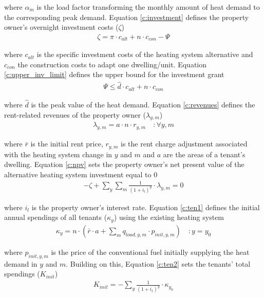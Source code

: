 where $\alpha_{m}$ is the load factor transforming the monthly amount of heat demand to the corresponding peak demand. Equation \ref{c:investment} defines the property owner's overnight investment costs ($\zeta$)
\begin{align}\label{c:investment}
\zeta = \pi \cdot c_{alt} + n \cdot c_{con} - \Psi
\end{align}

where $c_{alt}$ is the specific investment costs of the heating system alternative and $c_{con}$ the construction costs to adapt one dwelling/unit. Equation \ref{c:upper_inv_limit} defines the upper bound for the investment grant 
\begin{align}\label{c:upper_inv_limit}
\Psi \leq \hat{d} \cdot c_{alt} + n \cdot c_{con}
\end{align}

where $\hat{d}$ is the peak value of the heat demand. Equation \ref{c:revenues} defines the rent-related revenues of the property owner ($\lambda_{y,m}$)
\begin{align}\label{c:revenues}
\lambda_{y,m} = a \cdot n \cdot r_{y,m} \quad :\forall y,m
\end{align}

where $\bar{r}$ is the initial rent price, $r_{y,m}$ is the rent charge adjustment associated with the heating system change in $y$ and $m$ and $a$ are the areas of a tenant's dwelling. Equation \ref{c:npv} sets the property owner's net present value of the alternative heating system investment equal to 0
\begin{align}\label{c:npv}
-\zeta + \sum_{y} \sum_{m} \frac{1}{(1+i_l)^y} \cdot \lambda_{y,m} = 0
\end{align}

where $i_l$ is the property owner's interest rate. Equation \ref{c:ten1} defines the initial annual spendings of all tenants ($\kappa_{y}$) using the existing heating system 
\begin{align}\label{c:ten1}
\kappa_{y} = n \cdot (\bar{r} \cdot a + \sum_{m} q_{load,y,m} \cdot p_{init,y,m}) \quad :y=y_0
\end{align}

where $p_{init,y,m}$ is the price of the conventional fuel initially supplying the heat demand in $y$ and $m$. Building on this, Equation \ref{c:ten2} sets the tenants' total spendings ($K_{init}$)
\begin{align}\label{c:ten2}
K_{init} = -\sum_{y} \frac{1}{(1+i_{t})^y} \cdot \kappa_{y_0}
\end{align}

